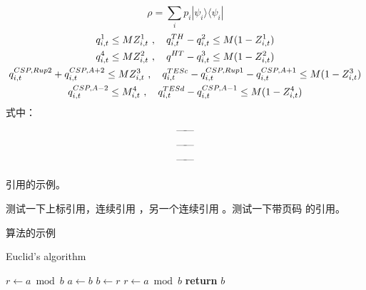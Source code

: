 \begin{equation}
\rho = \sum_i p_i  |\psi_i \rangle \langle \psi_i |
\end{equation}
\begin{gather}
q^1_{i,t}\le MZ^{1}_{i,t}\ , \quad q^{TH}_{i,t}-q^{2}_{i,t}\le M(1-Z^1_{i,t})\allowdisplaybreaks[2]\\
q^4_{i,t} \le MZ^2_{i,t}\ ,\quad q^{HT}-q^3_{i,t} \le M(1-Z^2_{i,t})\allowdisplaybreaks[2]\\
q^{CSP,Rup2}_{i,t}+q^{CSP,A+2}_{i,t} \le MZ^3_{i,t}\ ,\quad q^{TESc}_{i,t}-q^{CSP,Rup1}_{i,t}-q^{CSP,A+1}_{i,t} \le M(1-Z^3_{i,t})\allowdisplaybreaks[2]\\
q^{CSP,A-2}_{i,t}\le M^4_{i,t}\ ,\quad q^{TESd}_{i,t}-q^{CSP,A-1}_{i,t}\le M(1-Z^4_{i,t})
\end{gather}
式中：
\begin{align*}
\begin{alignedat}{3}
&  &\text{---\hspace*{-1mm}---}& \text{}\allowdisplaybreaks[2]\\
&  &\text{---\hspace*{-1mm}---}& \text{}\allowdisplaybreaks[2]\\
&  &\text{---\hspace*{-1mm}---}& \text{}\allowdisplaybreaks[2]\\
\end{alignedat}
\end{align*}

引用的示例。

测试一下上标引用，连续引用
\cite{newman2001random,aiello2000random,bollobas2001random}，另一个连续引用
\cite{newman2001random,bollobas2001random,barabasi1999emergence}。测试一下带页码
的引用\cite[124--128]{erdHos1961strength}。

算法的示例

\begin{algorithm}
    \caption{Euclid’s algorithm}
    \label{alg:euclid}
    \begin{algorithmic}[1]
        \State $r\gets a\bmod b$
        \State $a\gets b$
        \State $b\gets r$
        \State $r\gets a\bmod b$
        \EndWhile\label{euclidendwhile}
       \State \textbf{return} $b$
       \EndProcedure
   \end{algorithmic}
\end{algorithm}


